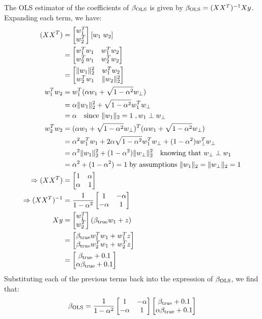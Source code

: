 \documentclass[12pt,twoside]{article}
\begin{document}
\begin{enumerate}
\begin{enumerate}
The OLS estimator of the coefficients of $\beta_{\operatorname{OLS}}$  is given by $\beta_{\operatorname{OLS}} = (X X^T)^{-1} X y$.
Expanding each term, we have:
\begin{align*}
 	(X X^T)				&=	\begin{bmatrix} w_1^T \\ w_2^T \end{bmatrix} [w_1 \; w_2]	\\
						&=	\begin{bmatrix} w_1^T w_1 & w_1^T w_2 \\ w_2^T w_1 & w_2^T w_2 \end{bmatrix}	\\
						&= 	\begin{bmatrix} \|w_1\|_2^2 & w_1^T w_2 \\ w_2^T w_1  & \|w_2\|_2^2 \end{bmatrix} \\
	w_1^T w_2			&=	w_1^T (\alpha w_1 + \sqrt{1-\alpha^2} w_{\perp}) \\
						&=	\alpha \|w_1\|_2^2 + \sqrt{1-\alpha^2}  w_1^T w_{\perp} \\
						&=	\alpha \text{ ~ since } \|w_1\|_2 = 1 \;, w_1 \perp  w_{\perp} \\
	w_2^T w_2			&= 	(\alpha w_1 + \sqrt{1-\alpha^2} w_{\perp})^T (\alpha w_1 + \sqrt{1-\alpha^2} w_{\perp}) \\
						&= 	\alpha^2 w_1^T w_1 + 2 \alpha \sqrt{1-\alpha^2} w_1^T w_{\perp} + (1-\alpha^2) w_{\perp}^T w_{\perp} \\
						&=	\alpha^2 \| w_1 \|_2^2 +  (1-\alpha^2) \|w_{\perp}\|_2^2 \text{ ~  knowing that }  w_{\perp} \perp w_1 \\
						&=	\alpha^2 +  (1-\alpha^2) = 1 \; \text{by assumptions } \| w_1 \|_2 = \|w_{\perp}\|_2 = 1 \\
	\Rightarrow (X X^T)		&= 	\begin{bmatrix} 1 & \alpha \\ \alpha & 1 \end{bmatrix} \\
	\Rightarrow (X X^T)^{-1}	&=	\frac{1}{1-\alpha^2} \begin{bmatrix} 1 & -\alpha \\ -\alpha  & 1 \end{bmatrix} \\
	X y					&= 	\begin{bmatrix} w_1^T \\ w_2^T \end{bmatrix} (\beta_{\operatorname{true}} w_1 + z) \\
						&=	\begin{bmatrix} \beta_{\operatorname{true}} w_1^T w_1 + w_1^T z \\ \beta_{\operatorname{true}} w_2^T w_1 + w_2^T z  \end{bmatrix} \\
						&=	\begin{bmatrix} \beta_{\operatorname{true}} + 0.1 \\ \alpha \beta_{\operatorname{true}} + 0.1 \end{bmatrix}	
\end{align*}
Substituting each of the previous terms back into the expression of $\beta_{\operatorname{OLS}}$, we find that:
\begin{align*}
	\beta_{\op{OLS}}		&=	\frac{1}{1-\alpha^2} \MAT{1 & -\alpha \\ -\alpha  & 1}  \MAT{\beta_{\op{true}} + 0.1 \\ \alpha \beta_{\op{true}} + 0.1} \\

\end{align*}
\end{enumerate}
\end{enumerate}
\end{document}
